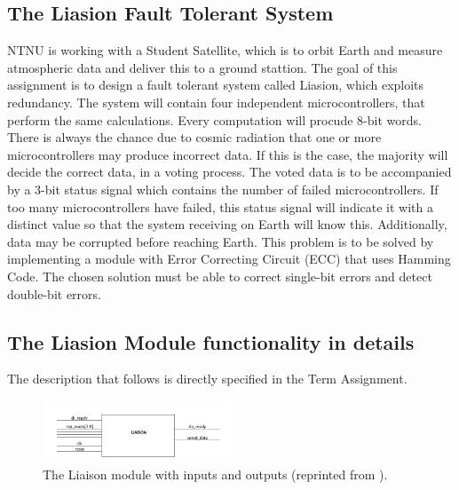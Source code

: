 \documentclass[a4paper]{IEEEtran}
\begin{document}
\subsection{The Liasion Fault Tolerant System}
NTNU is working with a Student Satellite, which is to orbit Earth and measure atmospheric data and deliver this to a ground stattion.
The goal of this assignment\protect\cite{assignment-text} is to design a fault tolerant system called Liasion, which exploits redundancy.
The system will contain four independent microcontrollers, that perform the same calculations.
Every computation will procude 8-bit words.
There is always the chance due to cosmic radiation that one or more microcontrollers may produce incorrect data.
If this is the case, the majority will decide the correct data, in a voting process.
The voted data is to be accompanied by a 3-bit status signal which contains the number of failed microcontrollers.
If too many microcontrollers have failed, this status signal will indicate it with a distinct value so that the system receiving on Earth will know this.
Additionally, data may be corrupted before reaching Earth.
This problem is to be solved by implementing a module with Error Correcting Circuit (ECC) that uses Hamming Code\protect\cite{hamming-codes}.
The chosen solution must be able to correct single-bit errors and detect double-bit errors\protect\cite{assignment-text}.

\subsection{The Liasion Module functionality in details}
The description that follows is directly specified in the Term Assignment\protect\cite{assignment-text}.
\begin{figure}[h!]
    \centering
    \includegraphics[width=0.5\textwidth]{Figures/ProjectDescription/LiaisonBlackBox}
    \caption{The Liaison module with inputs and outputs (reprinted from \protect\cite{assignment-text}).}
    \label{fig:LiaisonBlackBox}
\end{figure}
\end{document}
